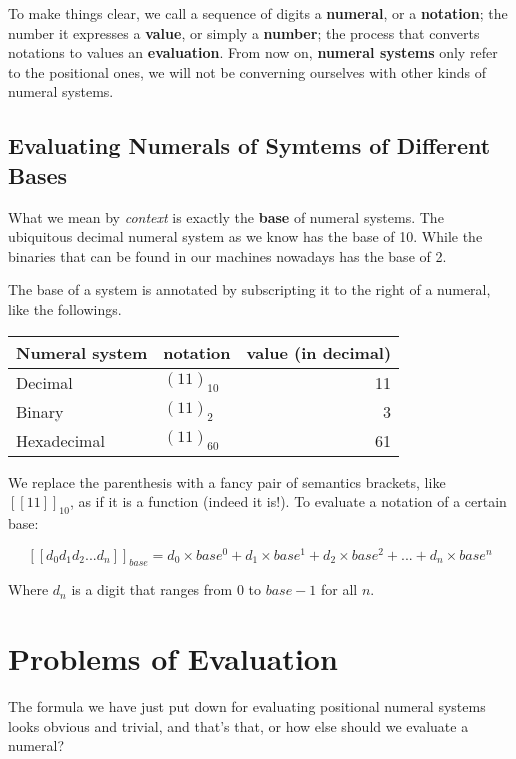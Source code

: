 \documentclass[../thesis.tex]{subfiles}
\begin{document}
To make things clear, we call a sequence of digits a \textbf{numeral}, or a \textbf{notation};
the number it expresses a \textbf{value}, or simply a \textbf{number};
the process that converts notations to values an \textbf{evaluation}.
From now on, \textbf{numeral systems} only refer to the positional ones,
we will not be converning ourselves with other kinds of numeral systems.

\subsection{Evaluating Numerals of Symtems of Different Bases}

What we mean by \textit{context} is exactly the \textbf{base} of numeral systems.
The ubiquitous decimal numeral system as we know has the base of 10.
While the binaries that can be found in our machines nowadays has the base of 2.

The base of a system is annotated by subscripting it to the right of a numeral,
like the followings.

\begin{center}
    \begin{tabular}{ | l | l | r | }
    Numeral system      & notation          & value (in decimal)  \\
    \hline
    Decimal             & $ ({11})_{10} $   & 11    \\
    Binary              & $ ({11})_{2} $    & 3     \\
    Hexadecimal         & $ ({11})_{60} $   & 61    \\
    \end{tabular}
\end{center}

We replace the parenthesis with a fancy pair of semantics brackets,
like $ [\![ 11 ]\!]_{10} $, as if it is a function (indeed it is!).
To evaluate a notation of a certain base:

$$
    [\![d_0d_1d_2...d_n]\!]_{base}
    =
    d_0\times base^0 + d_1\times base^1 + d_2\times base^2 + ... + d_n\times base^n
$$

Where $ d_{n} $ is a digit that ranges from $ 0 $ to $ base - 1 $ for all $ n $.

\section{Problems of Evaluation}

The formula we have just put down for evaluating positional numeral systems
looks obvious and trivial, and that's that, or how else should we evaluate a numeral?
\end{document}
